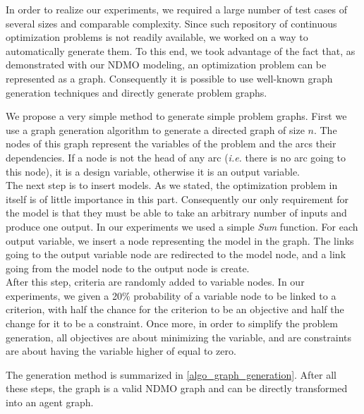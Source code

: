 In order to realize our experiments, we required a large number of test cases of several sizes and comparable complexity. Since such repository of continuous optimization problems is not readily available, we worked on a way to automatically generate them. To this end, we took advantage of the fact that, as demonstrated with our NDMO modeling, an optimization problem can be represented as a graph. Consequently it is possible to use well-known graph generation techniques and directly generate problem graphs.

We propose a very simple method to generate simple problem graphs. First we use a graph generation algorithm to generate a directed graph of size $n$. The nodes of this graph represent the variables of the problem and the arcs their dependencies. If a node is not the head of any arc (\emph{i.e.} there is no arc going to this node), it is a design variable, otherwise it is an output variable.\\
The next step is to insert models. As we stated, the optimization problem in itself is of little importance in this part. Consequently our only requirement for the model is that they must be able to take an arbitrary number of inputs and produce one output. In our experiments we used a simple \emph{Sum} function. For each output variable, we insert a node representing the model in the graph. The links going to the output variable node are redirected to the model node, and a link going from the model node to the output node is create.\\
After this step, criteria are randomly added to variable nodes. In our experiments, we given a 20\% probability of a variable node to be linked to a criterion, with half the chance for the criterion to be an objective and half the change for it to be a constraint. Once more, in order to simplify the problem generation, all objectives are about minimizing the variable, and are constraints are about having the variable higher of equal to zero.

The generation method is summarized in \ref{algo_graph_generation}. After all these steps, the graph is a valid NDMO graph and can be directly transformed into an agent graph.

